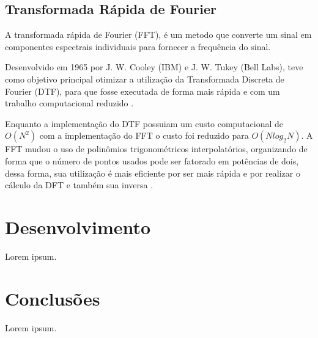 \documentclass{sbrt}
\begin{document}
\subsection{Transformada Rápida de Fourier}

A transformada rápida de Fourier (FFT), é um metodo que  converte um sinal em componentes espectrais individuais para fornecer a frequência do sinal.

Desenvolvido em 1965 por  J. W. Cooley (IBM) e J. W. Tukey
(Bell Labs), teve como objetivo principal otimizar a utilização da Transformada Discreta de Fourier (DTF), para que fosse executada de forma mais rápida e com um trabalho computacional reduzido \cite{martins2016analise}.

Enquanto a implementação do DTF possuiam um custo computacional de $O(N^2)$ com a implementação do FFT o custo foi reduzido para $O(N log_2 N)$. A FFT mudou o uso de polinômios trigonométricos interpolatórios, organizando de forma que o número de pontos usados pode ser fatorado em potências de dois, dessa forma, sua utilização é mais eficiente por ser mais rápida e por realizar o cálculo da DFT e também sua inversa \cite{reis2008implementaccao}.


\section{Desenvolvimento}

Lorem ipsum.


\section{Conclusões}

Lorem ipsum.





\end{document}
